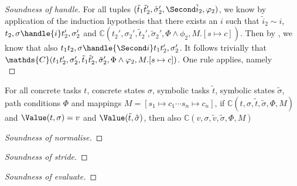 \begin{proof}[Soundness of handle]
{  For all tuples $(\tilde{t}_1\And\tilde{t}_2',\tilde{\sigma}_2',\Second \tilde{i}_2,\phi_2)$,
  we know by application of the induction hypothesis that there exists an $i$ such that
  $\tilde{i}_2\sim i$, $t_2,\sigma\handle{i}t_2',\sigma_2'$ and
  $\mathds{C}(t_2',\sigma_2',\tilde{t}_2',\tilde{\sigma}_2',\Phi\land\phi_2,M.[s\mapsto c])$.
  Then by , we know that also $t_1\And t_2,\sigma\handle{\Second i}t_1\And t_2',\sigma_2'$.
  It follows trivially that $\mathds{C}(t_1\And t_2',\sigma_2',\tilde{t}_1\And \tilde{t}_2',\tilde{\sigma}_2',\Phi\land\phi_2,M.[s\mapsto c])$.
}
%
{One rule applies, namely \\
%
%
%
%
%
%
}

\end{proof}


\begin{lemma}
  \label{lem:valpres}
  For all concrete tasks $t$, concrete states $\sigma$, symbolic tasks $\tilde{t}$, symbolic states $\tilde{\sigma}$, path conditions $\Phi$ and mappings $M=[s_1\mapsto c_1\cdots s_n\mapsto c_n]$,
  if $\mathds{C}(t,\sigma,\tilde{t},\tilde{\sigma},\Phi,M)$ and $\Value(t,\sigma)=v$ and $\Value(\tilde{t},\tilde{\sigma})$,
  then also $\mathds{C}(v,\sigma,\tilde{v},\tilde{\sigma},\Phi,M)$
\end{lemma}

\begin{proof}[Soundness of normalise]

\end{proof}

\begin{proof}[Soundness of stride]

\end{proof}

\begin{proof}[Soundness of evaluate]

\end{proof}
